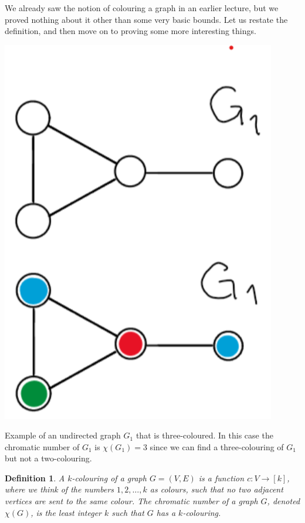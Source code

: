 \documentclass[nobib]{tufte-handout}
\newtheorem{definition}{Definition}
\begin{document}
We already saw the notion of colouring a graph in an earlier lecture, but we proved nothing about it other than some very basic bounds. Let us restate the definition, and then move on to proving some more interesting things.
\begin{marginfigure}
    \centering
    \includegraphics[width=0.9\textwidth]{graphics/L12_colouring/k-coloring.png}
    \caption{
    Example of an undirected graph $G_1$ that is three-coloured. In this case the chromatic number of $G_1$ is $\chi(G_1)=3$ since we can find a three-colouring of $G_1$ but not a two-colouring.
    }
\end{marginfigure}
\begin{definition}
  A \emph{$k$-colouring} of a graph $G = (V,E)$ is a function $c: V \to [k]$, where we think of the numbers $1,2,\ldots,k$ as colours, such that no two adjacent vertices are sent to the same colour. The \emph{chromatic number} of a graph $G$, denoted $\chi(G)$, is the least integer $k$ such that $G$ has a $k$-colouring.
\end{definition}
\end{document}
